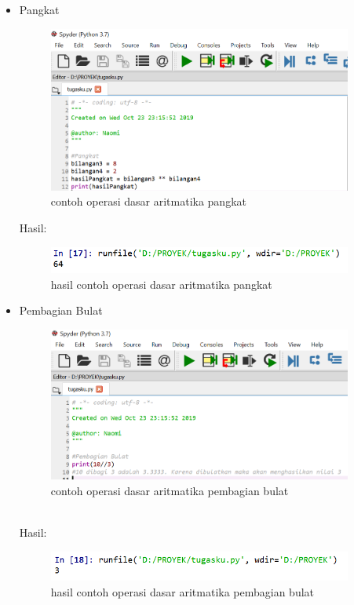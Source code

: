 \begin{enumerate}
\begin{itemize}
\item Pangkat
\begin{figure}[!htbp]
\centering
\includegraphics[width=10cm]{gambar2/pangkat.png}
\caption{contoh operasi dasar aritmatika pangkat}
\end{figure}
\newpage
Hasil:
\begin{figure}[!htbp]
\centering
\includegraphics[width=10cm]{gambar2/pangkat1.png}
\caption{hasil contoh operasi dasar aritmatika pangkat}
\end{figure}

\item Pembagian Bulat
\begin{figure}[!htbp]
\centering
\includegraphics[width=10cm]{gambar2/bulat.png}
\caption{contoh operasi dasar aritmatika pembagian bulat}
\end{figure}\\
Hasil:
\begin{figure}[!htbp]
\centering
\includegraphics[width=10cm]{gambar2/bulat1.png}
\caption{hasil contoh operasi dasar aritmatika pembagian bulat}
\end{figure}
\end{itemize}


\end{enumerate}
